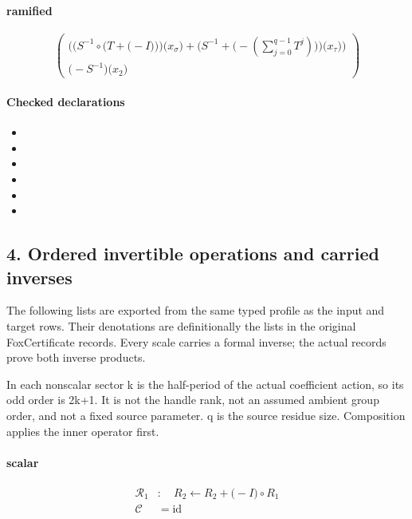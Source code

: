\paragraph{ramified}
\[\begin{pmatrix}\bigl(\bigl(S^{-1}\circ \bigl(T+\bigl(-I\bigr)\bigr)\bigr)\bigl(x_{\sigma}\bigr)+\bigl(S^{-1}+\bigl(-\left(\sum_{j=0}^{q-1}T^{j}\right)\bigr)\bigr)\bigl(x_{\tau}\bigr)\bigr)\\\bigl(-S^{-1}\bigr)\bigl(x_{2}\bigr)\end{pmatrix}\]
\paragraph{Checked declarations}
\begin{itemize}
\item {}
\item {}
\item {}
\item {}
\item {}
\item {}
\end{itemize}

\subsection*{4. Ordered invertible operations and carried inverses}
The following lists are exported from the same typed profile as the input and target rows. Their denotations are definitionally the lists in the original FoxCertificate records. Every scale carries a formal inverse; the actual records prove both inverse products.

In each nonscalar sector k is the half-period of the actual coefficient action, so its odd order is 2k+1. It is not the handle rank, not an assumed ambient group order, and not a fixed source parameter. q is the source residue size. Composition applies the inner operator first.

\paragraph{scalar}
\[\begin{aligned}\mathcal R_{1}&:\quad R_2 \leftarrow R_2+\bigl(-I\bigr)\circ R_1\\\mathcal C&=\mathrm{id}\end{aligned}\]
